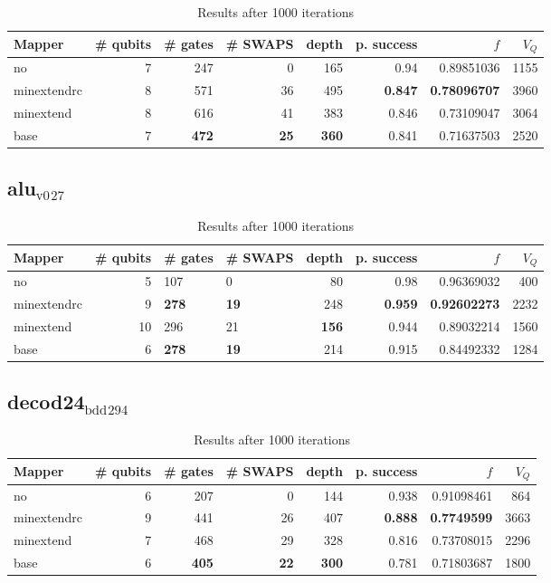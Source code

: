 \documentclass[11pt]{article}
\begin{document}
\begin{table}[H]
\caption{\label{tab:orge596972}
Results after 1000 iterations}
\centering
\small
\begin{tabular}{lrrrrrrr}
\hline
Mapper & \# qubits & \# gates & \# SWAPS & depth & p. success & \(f\) & \(V_Q\)\\
\hline
no & 7 & 247 & 0 & 165 & 0.94 & 0.89851036 & 1155\\
\hline
minextendrc & 8 & 571 & 36 & 495 & \textbf{0.847} & \textbf{0.78096707} & 3960\\
minextend & 8 & 616 & 41 & 383 & 0.846 & 0.73109047 & 3064\\
base & 7 & \textbf{472} & \textbf{25} & \textbf{360} & 0.841 & 0.71637503 & 2520\\
\hline
\end{tabular}
\end{table}
\subsection{alu\(_{\text{v0}}\)\(_{\text{27}}\)}
\label{sec:orge10314d}
\begin{table}[H]
\caption{\label{tab:orgfe6edad}
Results after 1000 iterations}
\centering
\small
\begin{tabular}{lrllrrrr}
\hline
Mapper & \# qubits & \# gates & \# SWAPS & depth & p. success & \(f\) & \(V_Q\)\\
\hline
no & 5 & 107 & 0 & 80 & 0.98 & 0.96369032 & 400\\
\hline
minextendrc & 9 & \textbf{278} & \textbf{19} & 248 & \textbf{0.959} & \textbf{0.92602273} & 2232\\
minextend & 10 & 296 & 21 & \textbf{156} & 0.944 & 0.89032214 & 1560\\
base & 6 & \textbf{278} & \textbf{19} & 214 & 0.915 & 0.84492332 & 1284\\
\hline
\end{tabular}
\end{table}
\subsection{decod24\(_{\text{bdd}}\)\(_{\text{294}}\)}
\label{sec:org65982e2}
\begin{table}[H]
\caption{\label{tab:orga6ed20b}
Results after 1000 iterations}
\centering
\small
\begin{tabular}{lrrrrrrr}
\hline
Mapper & \# qubits & \# gates & \# SWAPS & depth & p. success & \(f\) & \(V_Q\)\\
\hline
no & 6 & 207 & 0 & 144 & 0.938 & 0.91098461 & 864\\
\hline
minextendrc & 9 & 441 & 26 & 407 & \textbf{0.888} & \textbf{0.7749599} & 3663\\
minextend & 7 & 468 & 29 & 328 & 0.816 & 0.73708015 & 2296\\
base & 6 & \textbf{405} & \textbf{22} & \textbf{300} & 0.781 & 0.71803687 & 1800\\
\hline
\end{tabular}
\end{table}
\end{document}
